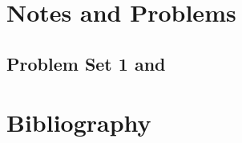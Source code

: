 \part{Notes and Problems}
   \chapter{Problem Set 1 and }
      
   
   
   
   
   
   
   
   

\part{Bibliography}
